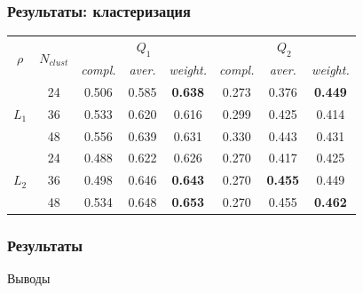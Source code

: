 \documentclass{beamer}
\begin{document}
\begin{frame}
    \frametitle{Результаты: кластеризация}   
    \begin{table}[h]
        \centering
        \begin{tabular}{c|c *{2}{|*{3}{c}}}
            \toprule
             &  &  &  \\
            \cmidrule(r){3-8}
            && \textit{compl.} & \textit{aver.} & \textit{weight.} & \textit{compl.} & \textit{aver.} & \textit{weight.} \\
            \midrule
                & 24    &   0.506  &   0.585 &    \textbf{0.638}  & 0.273   &  0.376    &   \textbf{0.449}  \\
                & 36    &   0.533  &   0.620 &    0.616  & 0.299   &  0.425    &   0.414  \\
                & 48    &   0.556  &   0.639 &    0.631  & 0.330   &  0.443    &   0.431  \\
        \midrule
                & 24    &   0.488  &   0.622 &    0.626  & 0.270   &  0.417    &   0.425  \\
                & 36    &   0.498  &   0.646 &    \textbf{0.643}  & 0.270   &  \textbf{0.455}    &   0.449  \\
                & 48    &   0.534  &   0.648 &    \textbf{0.653}  & 0.270   &  0.455    &   \textbf{0.462}  \\
        \bottomrule
        \end{tabular}
    \end{table}

\end{frame}


\begin{frame}
    \frametitle{Результаты}
    \begin{block}{Выводы}
        
    \end{block}
\end{frame}

\end{document}
